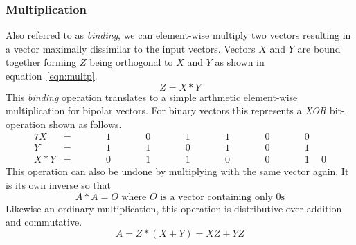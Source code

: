 \subsubsection{Multiplication}
Also referred to as \textit{binding}, we can element-wise multiply two vectors resulting in a vector maximally dissimilar to the input vectors. Vectors $X$ and $Y$ are bound together forming $Z$ being orthogonal to $X$ and $Y$ as shown in equation~\ref{eqn:multp}.
\begin{equation}
    \label{eqn:multp}
    Z = X * Y
\end{equation}
This \textit{binding} operation translates to a simple arthmetic element-wise multiplication for bipolar vectors. For binary vectors this represents a \textit{XOR} bit-operation shown as follows.
\begin{alignat*}{7}
    X &= && \qquad 1 && \qquad 0 && \qquad 1 && \qquad 1 && \qquad 0 && \qquad 0 \\
    Y &= && \qquad 1 && \qquad 1 && \qquad 0 && \qquad 1 && \qquad 0 && \qquad 1 \\
    \hline
    X * Y &= && \qquad 0 && \qquad 1 && \qquad 1 &&  \qquad 0 && \qquad 0 && \qquad 1 \phantom{-}0
\end{alignat*}
This operation can also be undone by multiplying with the same vector again. It is its own inverse so that
\begin{equation}
    \label{eqn:multpinv}
    A * A = O \text{ where $O$ is a vector containing only 0s}
\end{equation}
Likewise an ordinary multiplication, this operation is distributive over addition and commutative.
\begin{equation}
    \label{eqn:multpdis}
    A = Z*(X + Y) = XZ + YZ
\end{equation}